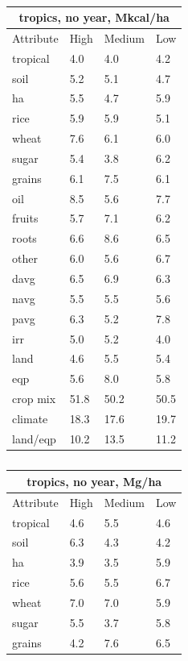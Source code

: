 \documentclass[11pt]{article}
\begin{document}
\begin{table}[h!]
\parbox{.45\linewidth} {
\centering
\begin{tabular}{llll}
\toprule
\multicolumn{4}{c}{\textbf{tropics, no year, Mkcal/ha}} \\
\midrule
Attribute & High & Medium & Low \\
\midrule
tropical & 4.0 & 4.0 & 4.2 \\
soil & 5.2 & 5.1 & 4.7 \\
ha & 5.5 & 4.7 & 5.9 \\
rice & 5.9 & 5.9 & 5.1 \\
wheat & 7.6 & 6.1 & 6.0 \\
sugar & 5.4 & 3.8 & 6.2 \\
grains & 6.1 & 7.5 & 6.1 \\
oil & 8.5 & 5.6 & 7.7 \\
fruits & 5.7 & 7.1 & 6.2 \\
roots & 6.6 & 8.6 & 6.5 \\
other & 6.0 & 5.6 & 6.7 \\
davg & 6.5 & 6.9 & 6.3 \\
navg & 5.5 & 5.5 & 5.6 \\
pavg & 6.3 & 5.2 & 7.8 \\
irr & 5.0 & 5.2 & 4.0 \\
land & 4.6 & 5.5 & 5.4 \\
eqp & 5.6 & 8.0 & 5.8 \\
\midrule
crop mix & 51.8 & 50.2 & 50.5 \\
climate & 18.3 & 17.6 & 19.7 \\
land/eqp & 10.2 & 13.5 & 11.2 \\
\bottomrule
\end{tabular}
\caption{ }
\label{k.ny.trop_percentages}
}
\parbox{.45\linewidth} {
\centering
\begin{tabular}{llll}
\toprule
\multicolumn{4}{c}{\textbf{tropics, no year, Mg/ha}} \\
\midrule
Attribute & High & Medium & Low \\
\midrule
tropical & 4.6  & 5.5 & 4.6 \\
soil & 6.3 & 4.3 & 4.2 \\
ha & 3.9 & 3.5 & 5.9 \\
rice & 5.6 & 5.5 & 6.7 \\
wheat & 7.0 & 7.0 & 5.9 \\
sugar & 5.5 & 3.7 & 5.8 \\
grains & 4.2 & 7.6 & 6.5 \\

\end{tabular}}
\end{table}
\end{document}
